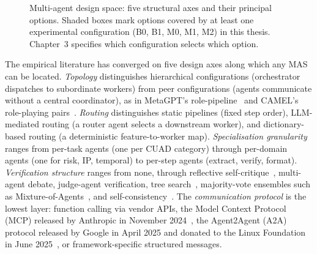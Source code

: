 \begin{figure}[h]
  \caption{Multi-agent design space: five structural axes and their principal options.
  Shaded boxes mark options covered by at least one experimental configuration
  (B0, B1, M0, M1, M2) in this thesis. Chapter~3 specifies which configuration
  selects which option.}
  \label{fig:mas-design-space}
\end{figure}

The empirical literature has converged on five design axes along which any MAS can be
located. \emph{Topology} distinguishes hierarchical configurations (orchestrator
dispatches to subordinate workers) from peer configurations (agents communicate
without a central coordinator), as in MetaGPT's role-pipeline~\cite{hong2024metagpt}
and CAMEL's role-playing pairs~\cite{li2023camel}. \emph{Routing} distinguishes
static pipelines (fixed step order), LLM-mediated routing (a router agent selects a
downstream worker), and dictionary-based routing (a deterministic feature-to-worker
map). \emph{Specialisation granularity} ranges from per-task agents (one per CUAD
category) through per-domain agents (one for risk, IP, temporal) to per-step agents
(extract, verify, format). \emph{Verification structure} ranges from none, through
reflective self-critique~\cite{shinn2023reflexion}, multi-agent debate, judge-agent
verification, tree search~\cite{yao2023tot}, majority-vote ensembles such as
Mixture-of-Agents~\cite{wang2024moa}, and self-consistency~\cite{wang2023selfconsistency}.
The \emph{communication protocol} is the lowest layer: function calling via vendor
APIs, the Model Context Protocol (MCP) released by Anthropic in November
2024~\cite{anthropicmcp2024}, the Agent2Agent (A2A) protocol released by Google in
April 2025 and donated to the Linux Foundation in June 2025~\cite{googlea2a2025}, or
framework-specific structured messages.

